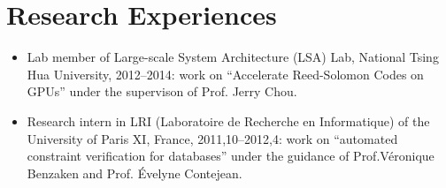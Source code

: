 \documentclass[letterpaper]{article}
\begin{document}
\section*{Research Experiences}

\begin{itemize}
    \item Lab member of Large-scale System Architecture (LSA) Lab, National Tsing Hua University, 2012--2014: work on ``Accelerate Reed-Solomon Codes on GPUs'' under the supervison of Prof. Jerry Chou.
    \item Research intern in LRI (Laboratoire de Recherche en Informatique) of the University of Paris XI, France, 2011,10--2012,4: work on ``automated constraint verification for databases'' under the guidance of Prof.V\'eronique Benzaken and Prof. \'Evelyne Contejean.
% 
% 

\end{itemize}
\end{document}
